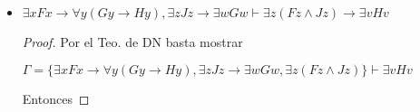 \documentclass[letterpaper,11pt]{article}
\begin{document}
\begin{enumerate}
\begin{itemize}
\begin{proof}
                Por $(\lor E)$ podemos concluir que $\Gamma \vdash \forall w 
                \neg (Fw \land Hw)$.
            \end{proof}

            \item $\exists x Fx \rightarrow \forall y(Gy \rightarrow Hy),
            \exists z Jz \rightarrow \exists w Gw \vdash \exists z(Fz \land Jz)
            \rightarrow \exists v Hv$
            
            \begin{proof}
                Por el Teo. de DN basta mostrar
                
                \begin{center}
                    $\Gamma = \{ \exists x Fx \rightarrow 
                    \forall y(Gy \rightarrow Hy), \exists z Jz \rightarrow 
                    \exists w Gw, \exists z(Fz \land Jz) \} \vdash\exists v Hv$
                \end{center}
                
                Entonces
                

\end{proof}
\end{itemize}
\end{enumerate}
\end{document}
